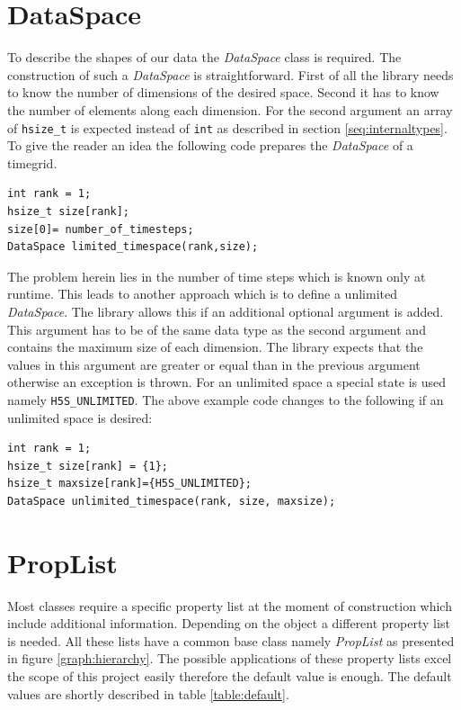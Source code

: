 \section{DataSpace}
\label{seq:dataspace}
To describe the shapes of our data the \textit{DataSpace} class is required. The construction of such a \textit{DataSpace} is straightforward. First of all the library needs to know the number of dimensions of the desired space. Second it has to know the number of elements along each dimension. For the second argument an array of \texttt{hsize\_t} is expected instead of \texttt{int} as described in section \ref{seq:internaltypes}. To give the reader an idea the following code prepares the \textit{DataSpace} of a timegrid.

\begin{lstlisting}
int rank = 1;
hsize_t size[rank];
size[0]= number_of_timesteps;
DataSpace limited_timespace(rank,size);
\end{lstlisting}
The problem herein lies in the number of time steps which is known only at runtime. This leads to another approach which is to define a unlimited \textit{DataSpace}. The library allows this if an additional optional argument is added. This argument has to be of the same data type as the second argument and contains the maximum size of each dimension. The library expects that the values in this argument are greater or equal than in the previous argument otherwise an exception is thrown. For an unlimited space a special state is used namely \texttt{H5S\_UNLIMITED}. The above example code changes to the following if an unlimited space is desired:
\begin{lstlisting}
int rank = 1;
hsize_t size[rank] = {1};
hsize_t maxsize[rank]={H5S_UNLIMITED};
DataSpace unlimited_timespace(rank, size, maxsize);
\end{lstlisting}

\section{PropList}
Most classes require a specific property list at the moment of construction which include additional information. Depending on the object a different property list is needed. All these lists have a common base class namely \textit{PropList} as presented in figure \ref{graph:hierarchy}. The possible applications of these property lists excel the scope of this project easily therefore the default value is enough. The default values are shortly described in table \ref{table:default}.

